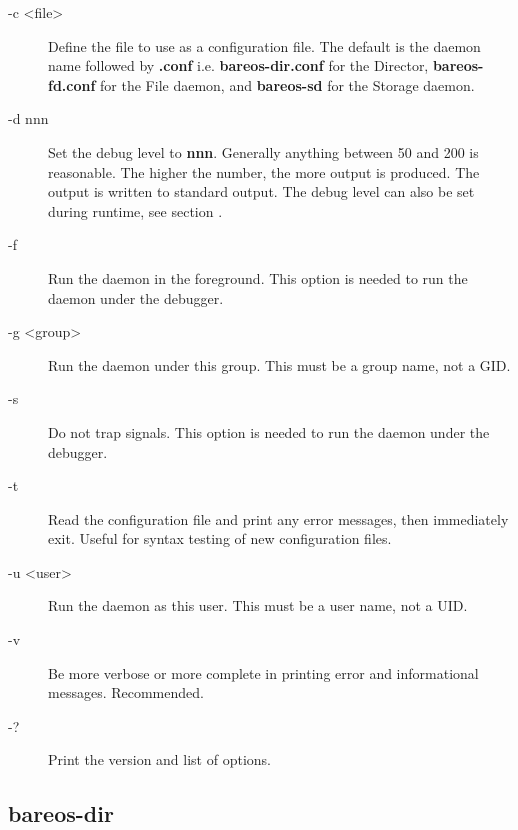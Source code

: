 \begin{description}

\item [-c {\textless}file{\textgreater}]
   Define the file to use as a  configuration file. The default is the daemon
   name followed  by {\bf .conf} i.e. {\bf bareos-dir.conf} for the Director,
   {\bf bareos-fd.conf} for the File daemon, and {\bf bareos-sd}  for the Storage
   daemon.

\item [-d nnn]
   Set the debug level to {\bf nnn}. 
   Generally anything between 50 and 200 is reasonable. 
   The higher the number, the more output is produced. The output is
   written to standard output.
   The debug level can also be set during runtime, see section .

\item [-f]
   Run the daemon in the foreground. This option is  needed to run the daemon
   under the debugger.

\item [-g {\textless}group{\textgreater}]
   Run the daemon under this group.  This must be a group name, not a GID.

\item [-s]
   Do not trap signals. This option is needed to run  the daemon under the
   debugger.

\item [-t]
   Read the configuration file and print any error messages,  then immediately
   exit. Useful for syntax testing of  new configuration files.

\item [-u {\textless}user{\textgreater}]
   Run the daemon as this user.  This must be a user name, not a UID.

\item [-v]
   Be more verbose or more complete in printing error  and informational
   messages. Recommended.

\item [-?]
   Print the version and list of options.

\end{description}


\subsection{bareos-dir}
\label{command-bareos-dir}

